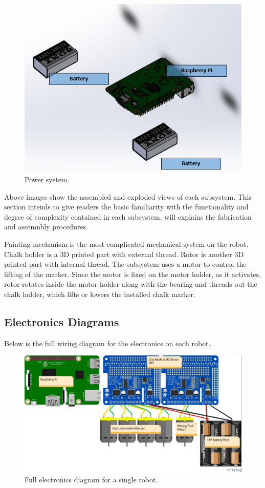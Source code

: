 \begin{figure}
\centering
\includegraphics[width=0.9\columnwidth]{hardware/CAD/Power System/Power.PNG}
\caption{Power system.}
\label{fig:power-diagram}
\end{figure}

Above images show the assembled and exploded views of each subsystem. This section intends to give readers the basic familiarity with the functionality and degree of complexity contained in each subsystem.  will explains the fabrication and assemnbly procedures.

Painting mechanism is the most complicated mechanical system on the robot. Chalk holder is a 3D printed part with external thread. Rotor is another 3D printed part with internal thread. The subsystem uses a motor to control the lifting of the marker. Since the motor is fixed on the motor holder, as it activates, rotor rotates inside the motor holder along with the bearing and threads out the chalk holder, which lifts or lowers the installed chalk marker.

\subsection{Electronics Diagrams}
\label{sec:electronics_diagrams}

Below is the full wiring diagram for the electronics on each robot. 

\begin{figure}
\centering
\includegraphics[width=0.9\columnwidth]{figs/wiring-diagram.jpg}
\caption{Full electronics diagram for a single robot.}
\label{fig:electronics-diagram}
\end{figure}

